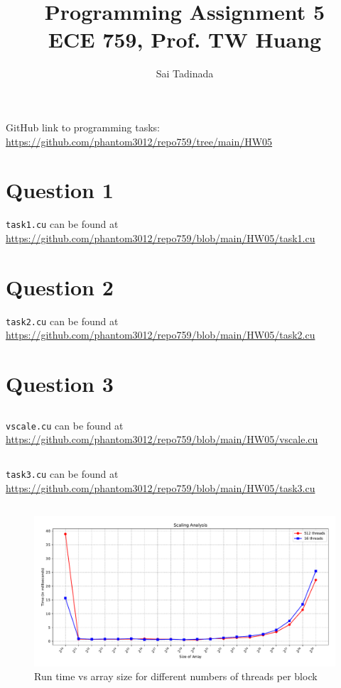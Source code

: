 \documentclass[12pt]{article}
\title{Programming Assignment 5 \\ \small{ECE 759, Prof. TW Huang}}
\author{Sai Tadinada}
\date{}
\begin{document}
\maketitle

GitHub link to programming tasks: \\ \url{https://github.com/phantom3012/repo759/tree/main/HW05}

\section{Question 1}
\texttt{task1.cu} can be found at \url{https://github.com/phantom3012/repo759/blob/main/HW05/task1.cu}

\section{Question 2}
\texttt{task2.cu} can be found at \url{https://github.com/phantom3012/repo759/blob/main/HW05/task2.cu}
\section{Question 3}
\subsection{}
\texttt{vscale.cu} can be found at \url{https://github.com/phantom3012/repo759/blob/main/HW05/vscale.cu}
\subsection{}
\texttt{task3.cu} can be found at \url{https://github.com/phantom3012/repo759/blob/main/HW05/task3.cu}
\newpage
\subsection{}
\begin{figure}[ht]
    \centering
    \includegraphics[width=\textwidth]{task3.pdf}
    \caption{Run time vs array size for different numbers of threads per block}
\end{figure}
\end{document}
